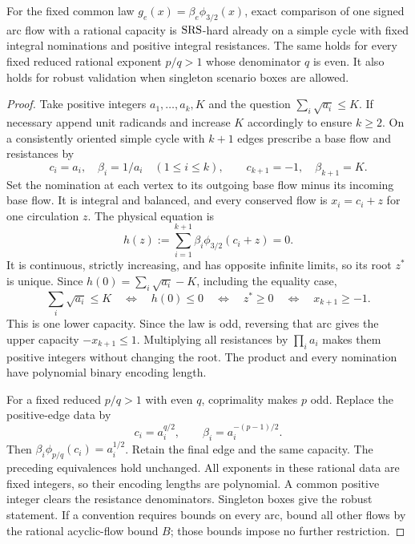 \begin{theorem}
\label{thm:a-law-srs}
For the fixed common law $g_e(x)=\beta_e\phi_{3/2}(x)$, exact comparison
of one signed arc flow with a rational capacity is $\mathrm{SRS}$-hard already
on a simple cycle with fixed integral nominations and positive integral
resistances. The same holds for every fixed reduced rational exponent
$p/q>1$ whose denominator $q$ is even. It also holds for robust validation
when singleton scenario boxes are allowed.
\end{theorem}
\begin{proof}
Take positive integers $a_1,\ldots,a_k,K$ and the question
$\sum_i\sqrt{a_i}\le K$. If necessary append unit radicands and increase
$K$ accordingly to ensure $k\ge2$. On a consistently oriented simple
cycle with $k+1$ edges prescribe a base flow and resistances by
\[
 c_i=a_i,\quad\beta_i=1/a_i\quad(1\le i\le k),\qquad
 c_{k+1}=-1,\quad\beta_{k+1}=K.
\]
Set the nomination at each vertex to its outgoing base flow minus its
incoming base flow. It is integral and balanced, and every conserved
flow is $x_i=c_i+z$ for one circulation $z$. The physical equation is
\[
 h(z):=\sum_{i=1}^{k+1}\beta_i\phi_{3/2}(c_i+z)=0.
\]
It is continuous, strictly increasing, and has opposite infinite limits,
so its root $z^*$ is unique. Since $h(0)=\sum_i\sqrt{a_i}-K$,
including the equality case,
\[
 \sum_i\sqrt{a_i}\le K
 \quad\Longleftrightarrow\quad h(0)\le0
 \quad\Longleftrightarrow\quad z^*\ge0
 \quad\Longleftrightarrow\quad x_{k+1}\ge-1.
\]
This is one lower capacity. Since the law is odd, reversing that arc
gives the upper capacity $-x_{k+1}\le1$. Multiplying all resistances by
$\prod_i a_i$ makes them positive integers without changing the root.
The product and every nomination have polynomial binary encoding length.

For a fixed reduced $p/q>1$ with even $q$, coprimality makes $p$ odd.
Replace the positive-edge data by
\[
 c_i=a_i^{q/2},\qquad\beta_i=a_i^{-(p-1)/2}.
\]
Then $\beta_i\phi_{p/q}(c_i)=a_i^{1/2}$. Retain the final edge and the
same capacity. The preceding equivalences hold unchanged. All exponents
in these rational data are fixed integers, so their encoding lengths
are polynomial. A common positive integer clears the resistance
denominators. Singleton boxes give the robust statement. If a convention
requires bounds on every arc, bound all other flows by the rational
acyclic-flow bound $B$; those bounds impose no further restriction.
\end{proof}

